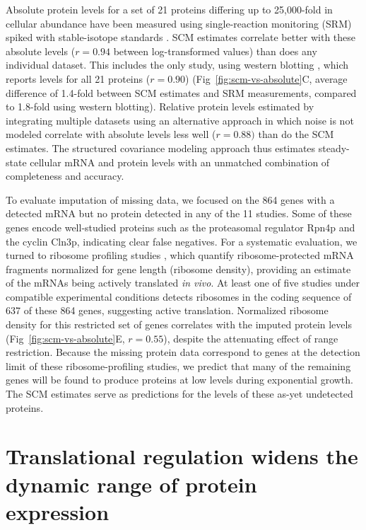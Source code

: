 \documentclass[10pt]{article}
\newcommand{\invivo}{\textit{in vivo}}
\begin{document}
Absolute protein levels for a set of 21 proteins differing up to 25,000-fold
in cellular abundance have been measured using single-reaction monitoring
(SRM) spiked with stable-isotope standards \cite{picotti09}. SCM estimates
correlate better with these absolute levels (\(r=0.94\) between log-transformed values) than does any individual dataset. This includes the only
study, using western blotting \cite{ghaemmaghami03}, which reports levels
for all 21 proteins (\(r=0.90\)) (Fig~\ref{fig:scm-vs-absolute}C, average
difference of 1.4-fold between SCM estimates and SRM measurements,
compared to 1.8-fold using western blotting). Relative protein levels
estimated by integrating multiple datasets using an alternative approach in
which noise is not modeled \cite{wang12} correlate with absolute levels less
well (\(r=0.88)\) than do the SCM estimates. The structured covariance
modeling approach thus estimates steady-state cellular mRNA and protein levels
with an unmatched combination of completeness and accuracy.

To evaluate imputation of missing data, we focused on the 864 genes with a
detected mRNA but no protein detected in any of the 11 studies.
Some of these genes encode well-studied proteins such as the proteasomal
regulator Rpn4p and the cyclin Cln3p, indicating  clear false negatives. For a systematic evaluation, we turned to ribosome profiling studies \cite{ingolia09}, which quantify ribosome-protected mRNA fragments normalized for gene length
(ribosome density), providing an estimate of the mRNAs being actively
translated \invivo. At
least one of five studies under compatible experimental conditions detects ribosomes in the
coding sequence of 637 of these 864 genes, suggesting active translation. Normalized ribosome density for this restricted set of genes correlates with the imputed
protein levels (Fig~\ref{fig:scm-vs-absolute}E, $r=0.55$), 
despite the attenuating effect of range restriction. Because the missing protein data correspond to genes at the detection limit of
these ribosome-profiling studies, we predict
that many of the remaining genes will be found to produce proteins at low
levels during exponential growth. The SCM estimates serve as predictions for the levels of these as-yet undetected proteins.

\section*{Translational regulation widens the dynamic range of protein expression}
\end{document}

